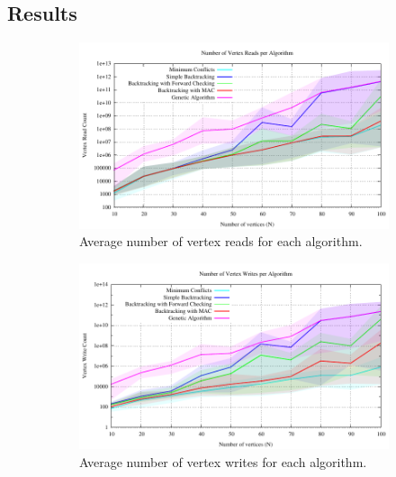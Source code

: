 \documentclass{article}
\begin{document}
	\subsection{Results}
	
		\begin{figure}[h!]
			\centering
			\begin{subfigure}{0.49\textwidth}
				\centering
				\includegraphics[width=\textwidth]{../results_5/comparing_read_performance}
				\caption{Average number of vertex reads for each algorithm.}
			\end{subfigure}
			\;
			\begin{subfigure}{0.49\textwidth}
				\centering
				\includegraphics[width=\textwidth]{../results_5/comparing_write_performance}
				\caption{Average number of vertex writes for each algorithm.}
			\end{subfigure} 
			\\
			\begin{subfigure}{0.49\textwidth}
				\centering

\end{subfigure}
\end{figure}
\end{document}
